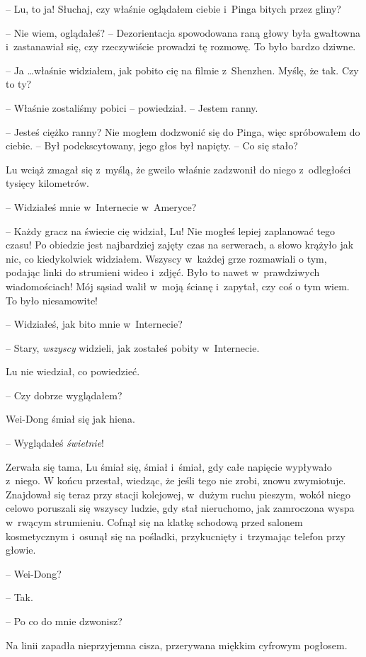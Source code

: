 \documentclass[oneside,polish,11pt,rmheadings]{mwbk}
\begin{document}
-- Lu, to ja! Słuchaj, czy właśnie oglądałem ciebie i~Pinga bitych przez gliny?

-- Nie wiem, oglądałeś? -- Dezorientacja spowodowana raną głowy była gwałtowna i~zastanawiał się, czy rzeczywiście prowadzi tę rozmowę. To było bardzo dziwne.

-- Ja \ldots  właśnie widziałem, jak pobito cię na filmie z~Shenzhen. Myślę, że tak. Czy to ty?

-- Właśnie zostaliśmy pobici -- powiedział. -- Jestem ranny.

-- Jesteś ciężko ranny? Nie mogłem dodzwonić się do Pinga, więc spróbowałem do ciebie. -- Był podekscytowany, jego głos był napięty. -- Co się stało? 

Lu wciąż zmagał się z~myślą, że gweilo właśnie zadzwonił do niego z~odległości tysięcy kilometrów. 

-- Widziałeś mnie w~Internecie w~Ameryce? 

-- Każdy gracz na świecie cię widział, Lu! Nie mogłeś lepiej zaplanować tego czasu! Po obiedzie jest najbardziej zajęty czas na serwerach, a słowo krążyło jak nic, co kiedykolwiek widziałem. Wszyscy w~każdej grze rozmawiali o tym, podając linki do strumieni wideo i~zdjęć. Było to nawet w~prawdziwych wiadomościach! Mój sąsiad walił w~moją ścianę i~zapytał, czy coś o tym wiem. To było niesamowite!

-- Widziałeś, jak bito mnie w~Internecie?

-- Stary, \textit{wszyscy }widzieli, jak zostałeś pobity w~Internecie.

Lu nie wiedział, co powiedzieć. 

-- Czy dobrze wyglądałem? 

Wei-Dong śmiał się jak hiena. 

-- Wyglądałeś \textit{świetnie}! 

Zerwała się tama, Lu śmiał się, śmiał i~śmiał, gdy całe napięcie wypływało z~niego. W końcu przestał, wiedząc, że jeśli tego nie zrobi, znowu zwymiotuje. Znajdował się teraz przy stacji kolejowej, w~dużym ruchu pieszym, wokół niego celowo poruszali się wszyscy ludzie, gdy stał nieruchomo, jak zamroczona wyspa w~rwącym strumieniu. Cofnął się na klatkę schodową przed salonem kosmetycznym i~osunął się na pośladki, przykucnięty i~trzymając telefon przy głowie.

-- Wei-Dong?

-- Tak. 

-- Po co do mnie dzwonisz? 

Na linii zapadła nieprzyjemna cisza, przerywana miękkim cyfrowym pogłosem.
\end{document}
